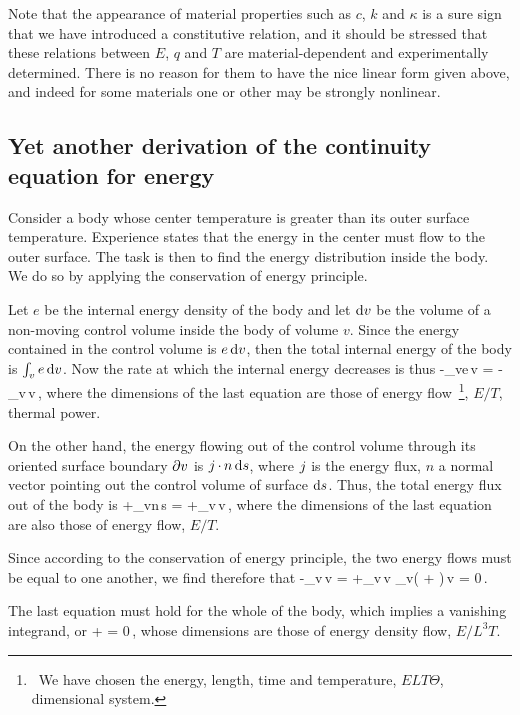 Note that the appearance of material properties such as $c$, $k$ and $\kappa$ is a sure sign that we have introduced a constitutive relation, and it should be stressed that these relations between $E$, $q$ and $T$ are material-dependent and experimentally determined. There is no  reason for them to have the nice linear form given above, and indeed for some materials one or other may be strongly nonlinear.


\subsection{Yet another derivation of the continuity equation for energy}
Consider a body whose center temperature is greater than its outer surface temperature. Experience states that the energy in the center must flow to the outer surface. The task is then to find the energy distribution inside the body. We do so by applying the conservation of energy principle.

Let $e$ be the internal energy density of the body and let $\text{d} v$ be the volume of a non-moving control volume inside the body of volume $v$. Since the energy contained in the control volume is $e\,\text{d} v$, then the total internal energy of the body is $\int_{v}e\,\text{d} v$. Now the rate at which the internal energy decreases is thus
\beq
-\int_{v}e\,\dx v = -\int_{v}\,\dx v\,,
\eeq
where the dimensions of the last equation are those of energy flow~\footnote{~We have chosen the energy, length, time and temperature, $ELT\Theta$, dimensional system.}, $E/T$, \aka thermal power.

On the other hand, the energy flowing out of the control volume through its oriented surface boundary $\partial v$ is $j\operatorname{\cdot} n\,\text{d} s$, where $j$ is the energy flux, $n$ a normal vector pointing out the control volume of surface $\text{d} s$. Thus, the total energy flux out of the body is
\beq
+\int_{\bound v}\flux\iprod n\,\dx s = +\int_{v}\div\flux\,\dx v\,,
\eeq
where the dimensions of the last equation are also those of energy flow, $E/T$.

Since according to the conservation of energy principle, the two energy flows must be equal to one another, we find therefore that
\beq
-\int_{v}\,\dx v = +\int_{v}\div\flux\,\dx v\implies
\int_{v}\left( + \div\flux \right)\,\dx v = 0\,.
\eeq

The last equation must hold for the whole of the body, which implies a vanishing integrand, or
\beq
{} + \div\flux = 0\,,
\eeq
whose dimensions are those of energy density flow, $E/L^3T$.

